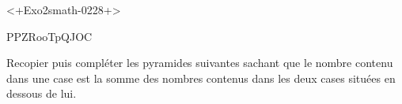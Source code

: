 
\begin{exercice}\label{exo2smath-0228}

<+Exo2smath-0228+>

PPZRooTpQJOC

Recopier puis compléter les pyramides suivantes sachant que le nombre contenu dans une case est la somme des nombres contenus dans les deux cases situées en dessous de lui.

\begin{multicols}{2}
\begin{center}
   
\end{center}

\columnbreak

\begin{center}
   
\end{center}
\end{multicols}


\end{exercice}
